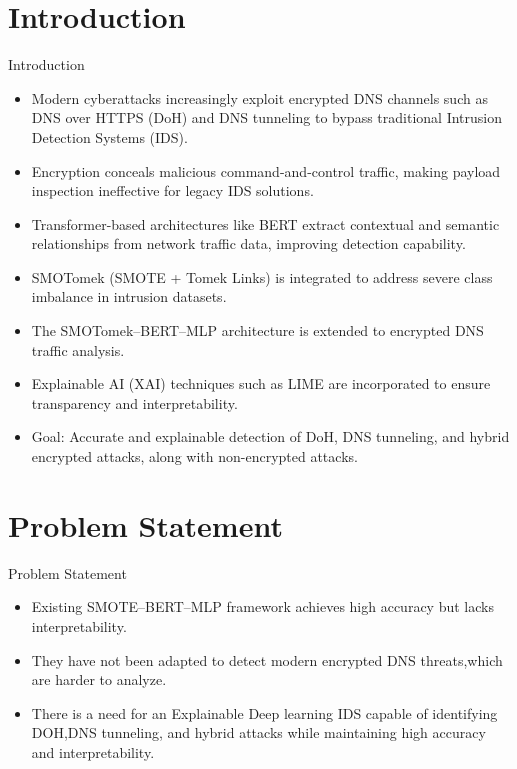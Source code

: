 \documentclass[aspectratio=169,xcolor=dvipsnames]{beamer}
\begin{document}
\section{Introduction}
\begin{frame}{Introduction}
\begin{itemize}
\item Modern cyberattacks increasingly exploit encrypted DNS channels such as DNS over HTTPS (DoH) and DNS tunneling to bypass traditional Intrusion Detection Systems (IDS).
\item Encryption conceals malicious command-and-control traffic, making payload inspection ineffective for legacy IDS solutions.
\item Transformer-based architectures like BERT extract contextual and semantic relationships from network traffic data, improving detection capability.
\item SMOTomek (SMOTE + Tomek Links) is integrated to address severe class imbalance in intrusion datasets.
\item The SMOTomek–BERT–MLP architecture is extended to encrypted DNS traffic analysis.
\item Explainable AI (XAI) techniques such as LIME are incorporated to ensure transparency and interpretability.
\item Goal: Accurate and explainable detection of DoH, DNS tunneling, and hybrid encrypted attacks, along with non-encrypted attacks.
\end{itemize}
\end{frame}

\section{Problem Statement}
\begin{frame}{Problem Statement}
\begin{itemize}
\item Existing SMOTE–BERT–MLP framework achieves high accuracy but lacks interpretability.
\item They have not been adapted to detect modern encrypted DNS threats,which are harder to analyze.
\item There is a need for an Explainable Deep learning IDS capable of identifying DOH,DNS tunneling, and hybrid attacks while maintaining high accuracy and interpretability.
\end{itemize}
\end{frame}
\end{document}
